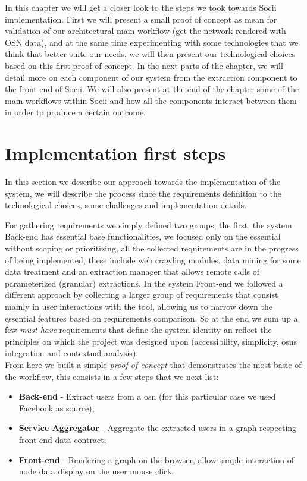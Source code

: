 In this chapter we will get a closer look to the steps we took towards Socii implementation. First we will present a small proof of concept as mean for validation of our architectural main workflow (get the network rendered with OSN data), and at the same time experimenting with some technologies that we think that better suite our needs, we will then present our technological choices based on this first proof of concept.
\indent In the next parts of the chapter, we will detail more on each component of our system from the extraction component to the front-end of Socii. We will also present at the end of the chapter some of the main workflows within Socii and how all the components interact between them in order to produce a certain outcome.

\section{Implementation first steps}
In this section we describe our approach towards the implementation of the system, we will describe the process since the requirements
definition to the technological choices, some challenges and implementation details.

For gathering requirements we simply defined two groups, the first, the system Back-end has essential base functionalities, we focused only
on the essential without scoping or prioritizing, all the collected requirements are in the progress of being implemented, these include
web crawling modules, data mining for some data treatment and an extraction manager that allows remote calls of parameterized (granular) extractions.
In the system Front-end we followed a different approach by collecting a larger group of requirements that consist mainly in user interactions with the tool,
allowing us to narrow down the essential features based on requirements comparison. So at the end we sum up a few \textit{must have} requirements that
define the system identity an reflect the principles on which the project was designed upon (accessibility, simplicity, \glspl{osn} integration and contextual analysis).\\

\indent From here we built a simple \textit{proof of concept} that demonstrates the most basic of the workflow, this consists in a few steps that we next list:
\begin{itemize}
    \item \textbf{Back-end} - Extract users from a \gls{osn} (for this particular case we used Facebook as source);
    \item \textbf{Service Aggregator} - Aggregate the extracted users in a graph respecting front end data contract;
    \item \textbf{Front-end} - Rendering a graph on the browser, allow simple interaction of node data display on the user mouse click.
\end{itemize}

